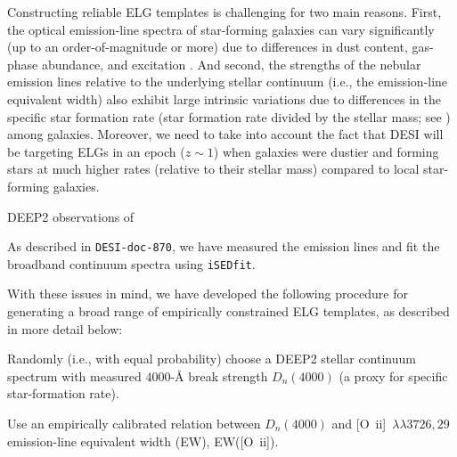 \documentclass[11pt]{article}
\newcommand{\ewoii}{EW([O~{\sc ii}])}
\newcommand{\oiilam}{[O~{\sc ii}]~\ensuremath{\lambda\lambda3726,29}}
\newcommand{\isedfit}{{\tt iSEDfit}}
\begin{document}
Constructing reliable ELG templates is challenging for two main reasons.  First,
the optical emission-line spectra of star-forming galaxies can vary
significantly (up to an order-of-magnitude or more) due to differences in dust
content, gas-phase abundance, and excitation \citep[e.g.,][]{kewley01a}.  And
second, the strengths of the nebular emission lines relative to the underlying
stellar continuum (i.e., the emission-line equivalent width) also exhibit large
intrinsic variations due to differences in the specific star formation rate
(star formation rate divided by the stellar mass; see \citealt{kennicutt94a})
among galaxies.  Moreover, we need to take into account the fact that DESI will
be targeting ELGs in an epoch ($z\sim1$) when galaxies were dustier and forming
stars at much higher rates (relative to their stellar mass) compared to local
star-forming galaxies.

DEEP2 observations of 

As described in {\tt DESI-doc-870}, we have measured the emission lines and fit
the broadband continuum spectra using \isedfit.

With these issues in mind, we have developed the following procedure for
generating a broad range of empirically constrained ELG templates, as described
in more detail below:
\begin{enumerate*}
\item{Randomly (i.e., with equal probability) choose a DEEP2 stellar continuum
  spectrum with measured $4000$-\AA{} break strength $D_{n}(4000)$ (a proxy for
  specific star-formation rate).}
\item{Use an empirically calibrated relation between $D_{n}(4000)$ and \oiilam{}
  emission-line equivalent width (EW), \ewoii.}
\end{enumerate*}
\end{document}
